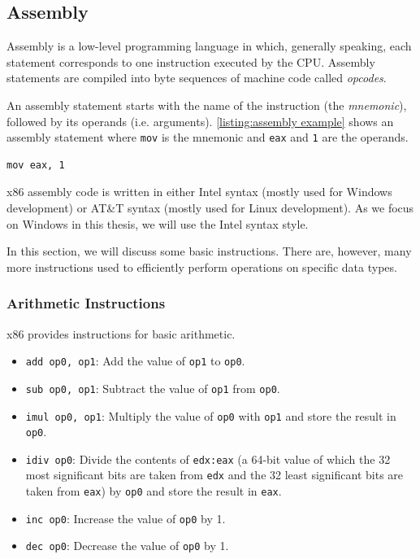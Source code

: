 
\subsection{Assembly}\label{section:assembly}
Assembly is a low-level programming language in which, generally speaking, each statement corresponds to one instruction executed by the CPU. Assembly statements are compiled into byte sequences of machine code called \emph{opcodes}.

An assembly statement starts with the name of the instruction (the \emph{mnemonic}), followed by its operands (i.e. arguments). \autoref{listing:assembly example} shows an assembly statement where \texttt{mov} is the mnemonic and \texttt{eax} and \texttt{1} are the operands.

\begin{lstlisting}[caption={A single instruction moving the integer \texttt{1} into the register \texttt{eax}.}, label={listing:assembly example}, captionpos=b]
mov eax, 1
\end{lstlisting}

x86 assembly code is written in either Intel syntax (mostly used for Windows development) or AT\&T syntax (mostly used for Linux development). As we focus on Windows in this thesis, we will use the Intel syntax style.

In this section, we will discuss some basic instructions. There are, however, many more instructions used to efficiently perform operations on specific data types.

\subsubsection{Arithmetic Instructions}
x86 provides instructions for basic arithmetic.

\begin{itemize}
    \item \texttt{add op0, op1}: Add the value of \texttt{op1} to \texttt{op0}.
    \item \texttt{sub op0, op1}: Subtract the value of \texttt{op1} from \texttt{op0}.
    \item \texttt{imul op0, op1}: Multiply the value of \texttt{op0} with \texttt{op1} and store the result in \texttt{op0}.
    \item \texttt{idiv op0}: Divide the contents of \texttt{edx:eax} (a 64-bit value of which the 32 most significant bits are taken from \texttt{edx} and the 32 least significant bits are taken from \texttt{eax}) by \texttt{op0} and store the result in \texttt{eax}.
    \item \texttt{inc op0}: Increase the value of \texttt{op0} by 1.
    \item \texttt{dec op0}: Decrease the value of \texttt{op0} by 1.
\end{itemize}

